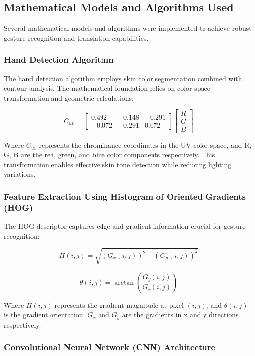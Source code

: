 \documentclass[12pt]{article}
\begin{document}
\subsection{Mathematical Models and Algorithms Used}

Several mathematical models and algorithms were implemented to achieve robust gesture recognition and translation capabilities.

\subsubsection{Hand Detection Algorithm}

The hand detection algorithm employs skin color segmentation combined with contour analysis. The mathematical foundation relies on color space transformation and geometric calculations:

\[
C_{uv} = \begin{bmatrix}
0.492 & -0.148 & -0.291 \\
-0.072 & -0.291 & 0.072
\end{bmatrix}
\begin{bmatrix}
R \\ G \\ B
\end{bmatrix}
\]

Where $C_{uv}$ represents the chrominance coordinates in the UV color space, and R, G, B are the red, green, and blue color components respectively. This transformation enables effective skin tone detection while reducing lighting variations.

\subsubsection{Feature Extraction Using Histogram of Oriented Gradients (HOG)}

The HOG descriptor captures edge and gradient information crucial for gesture recognition:

\[
H(i,j) = \sqrt{(G_x(i,j))^2 + (G_y(i,j))^2}
\]

\[
\theta(i,j) = \arctan\left(\frac{G_y(i,j)}{G_x(i,j)}\right)
\]

Where $H(i,j)$ represents the gradient magnitude at pixel $(i,j)$, and $\theta(i,j)$ is the gradient orientation. $G_x$ and $G_y$ are the gradients in x and y directions respectively.

\subsubsection{Convolutional Neural Network (CNN) Architecture}
\end{document}
